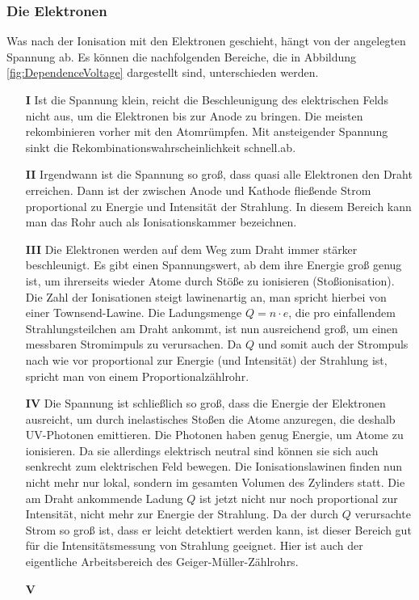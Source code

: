 \subsubsection*{Die Elektronen}
Was nach der Ionisation mit den Elektronen geschieht, hängt von der angelegten Spannung ab. Es können die nachfolgenden Bereiche, die in Abbildung \ref{fig:DependenceVoltage} dargestellt sind, unterschieden werden.
\begin{itemize}
	\item[\textbf{I}] Ist die Spannung klein, reicht die Beschleunigung des elektrischen Felds nicht aus, um die Elektronen bis zur Anode zu bringen. Die meisten rekombinieren vorher mit den Atomrümpfen. Mit ansteigender Spannung sinkt die Rekombinationswahrscheinlichkeit schnell.ab.
	\item[\textbf{II}] Irgendwann ist die Spannung so groß, dass quasi alle Elektronen den Draht erreichen. Dann ist der zwischen Anode und Kathode fließende Strom proportional zu Energie und Intensität der Strahlung. In diesem Bereich kann man das Rohr auch als Ionisationskammer bezeichnen.
	\item[\textbf{III}] Die Elektronen werden auf dem Weg zum Draht immer stärker beschleunigt. Es gibt einen Spannungswert, ab dem ihre Energie groß genug ist, um ihrerseits wieder Atome durch Stöße zu ionisieren (Stoßionisation). Die Zahl der Ionisationen steigt lawinenartig an, man spricht hierbei von einer Townsend-Lawine. Die Ladungsmenge $Q = n\cdot e$, die pro einfallendem Strahlungsteilchen am Draht ankommt, ist nun ausreichend groß, um einen messbaren Stromimpuls zu verursachen. Da $Q$ und somit auch der Strompuls nach wie vor proportional zur Energie (und Intensität) der Strahlung ist, spricht man von einem Proportionalzählrohr.
	\item[\textbf{IV}] Die Spannung ist schließlich so groß, dass die Energie der Elektronen ausreicht, um durch inelastisches Stoßen die Atome anzuregen, die deshalb UV-Photonen emittieren. Die Photonen haben genug Energie, um Atome zu ionisieren. Da sie allerdings elektrisch neutral sind können sie sich auch senkrecht zum elektrischen Feld bewegen. Die Ionisationslawinen finden nun nicht mehr nur lokal, sondern im gesamten Volumen des Zylinders statt. Die am Draht ankommende Ladung $Q$ ist jetzt nicht nur noch proportional zur Intensität, nicht mehr zur Energie der Strahlung. Da der durch $Q$ verursachte Strom so groß ist, dass er leicht detektiert werden kann, ist dieser Bereich gut für die Intensitätsmessung von Strahlung geeignet. Hier ist auch der eigentliche Arbeitsbereich des Geiger-Müller-Zählrohrs.
	\item[\textbf{V}] 
\end{itemize}
